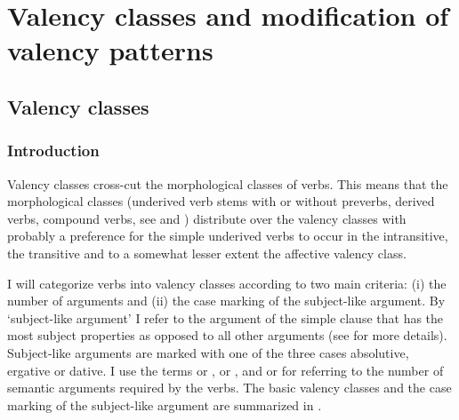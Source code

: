 \chapter{Valency classes and modification of valency patterns}
\label{cpt:Verb valency classes}


\section{Valency classes}
\label{sec:Verb valency classes}

\subsection{Introduction}
\label{sec:valencyclassesintro}

Valency classes cross-cut the morphological classes of verbs. This means that the morphological classes (underived verb stems with or without preverbs, derived verbs, compound verbs, see   and ) distribute over the valency classes with probably a preference for the simple underived verbs to occur in the intransitive, the transitive and to a somewhat lesser extent the affective valency class.

I will categorize verbs into valency classes according to two main criteria: (i) the number of arguments and (ii) the case marking of the subject-like argument. By `subject-like argument' I refer to the argument of the simple clause that has the most subject properties as opposed to all other arguments (see  for more details). Subject-like arguments are marked with one of the three cases absolutive, ergative or dative. I use the terms  or ,  or , and  or  for referring to the number of semantic arguments required by the verbs. The basic valency classes and the case marking of the subject-like argument are summarized in .



